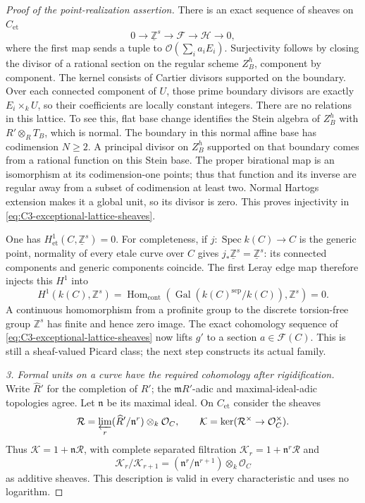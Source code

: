 \begin{proof}[Proof of the point-realization assertion]
There is an exact sequence of sheaves on
$C_{\mathrm{et}}$
\begin{equation}\label{eq:C3-exceptional-lattice-sheaves}
 0\longrightarrow\underline{\mathbb Z}^{s}
       \longrightarrow\mathcal F\longrightarrow\mathcal H
       \longrightarrow0,
\end{equation}
where the first map sends a tuple to
$\mathcal O(\sum_i a_iE_i)$.
Surjectivity follows by closing the divisor
of a rational section on the regular scheme
$Z_B^h$, component by component.
The kernel consists of Cartier divisors
supported on the boundary. Over each connected
component of $U$, those prime boundary divisors
are exactly $E_i\times_k U$, so their coefficients
are locally constant integers.
There are no relations in this lattice.
To see this, flat base change identifies the
Stein algebra of $Z_B^h$ with
$R'\otimes_RT_B$, which is normal.
The boundary in this normal affine base has
codimension $N\ge2$. A principal divisor on
$Z_B^h$ supported on that boundary comes from
a rational function on this Stein base.
The proper birational map is an isomorphism
at its codimension-one points; thus that
function and its inverse are regular away
from a subset of codimension at least two.
Normal Hartogs extension makes it a global
unit, so its divisor is zero. This proves
injectivity in \eqref{eq:C3-exceptional-lattice-sheaves}.

One has $H^1_{\mathrm{et}}(C,\underline{\mathbb Z}^{s})=0$.
For completeness, if $j:\operatorname{Spec}k(C)\to C$
is the generic point, normality of every etale
curve over $C$ gives
$j_*\underline{\mathbb Z}^{s}=\underline{\mathbb Z}^{s}$:
its connected components and generic components
coincide. The first Leray edge map therefore
injects this $H^1$ into
\[
 H^1(k(C),\mathbb Z^s)
   =\operatorname{Hom}_{\mathrm{cont}}
              (\operatorname{Gal}(k(C)^{\mathrm{sep}}/k(C)),\mathbb Z^s)=0.
\]
A continuous homomorphism from a profinite
group to the discrete torsion-free group
$\mathbb Z^s$ has finite and hence zero image.
The exact cohomology sequence of
\eqref{eq:C3-exceptional-lattice-sheaves} now
lifts $g'$ to a section $a\in\mathcal F(C)$.
This is still a sheaf-valued Picard class;
the next step constructs its actual family.

\emph{3. Formal units on a curve have the required
cohomology after rigidification.}
Write $\widehat R'$ for the completion of $R'$;
the $\mathfrak mR'$-adic and maximal-ideal-adic
topologies agree. Let $\mathfrak n$ be its
maximal ideal. On $C_{\mathrm{et}}$ consider
the sheaves
\[
 \mathcal R=\varprojlim_r
       (\widehat R'/\mathfrak n^r)\otimes_k\mathcal O_C,
 \qquad \mathcal K=\ker(\mathcal R^\times\to\mathcal O_C^\times).
\]
Thus $\mathcal K=1+\mathfrak n\mathcal R$,
with complete separated filtration
$\mathcal K_r=1+\mathfrak n^r\mathcal R$ and
\begin{equation}\label{eq:C3-formal-unit-quotients}
 \mathcal K_r/\mathcal K_{r+1}
       = (\mathfrak n^r/\mathfrak n^{r+1})\otimes_k\mathcal O_C
\end{equation}
as additive sheaves. This description is
valid in every characteristic and uses no
logarithm.


\end{proof}
